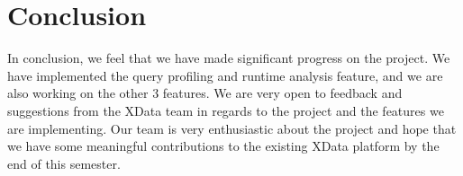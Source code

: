 \documentclass{article}
\begin{document}
\section{Conclusion}

In conclusion, we feel that we have made significant progress on the project. We have implemented the query profiling and runtime analysis feature, and we are also working on the other 3 features. We are very open to feedback and suggestions from the XData team in regards to the project and the features we are implementing. Our team is very enthusiastic about the project and hope that we have some meaningful contributions to the existing XData platform by the end of this semester.

    
\end{document}

